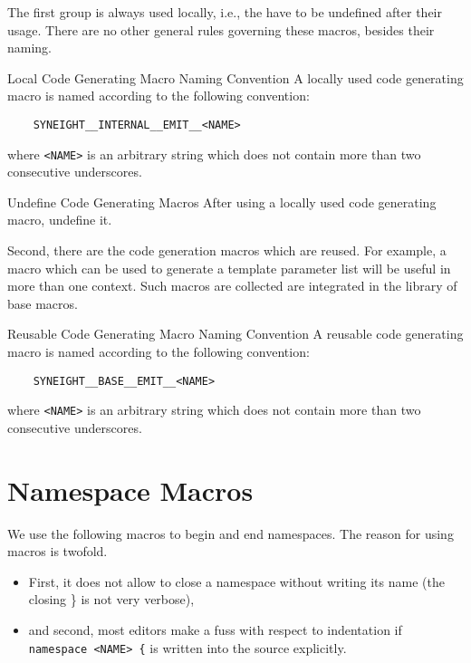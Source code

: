 The first group is always used locally, i.e., the have to be undefined
after their usage. There are no other general rules governing these
macros, besides their naming.

\begin{rule*}{Local Code Generating Macro Naming Convention}
  A locally used code generating macro is named according to the
  following convention:
  \begin{verbatim}
    SYNEIGHT__INTERNAL__EMIT__<NAME>
  \end{verbatim}
  where {\tt <NAME>} is an arbitrary string which does not contain
  more than two consecutive underscores.
\end{rule*}

\begin{rule*}{Undefine Code Generating Macros}
  After using a locally used code generating macro, undefine it.
\end{rule*}

Second, there are the code generation macros which are reused. For
example, a macro which can be used to generate a template parameter
list will be useful in more than one context. Such macros are
collected are integrated in the library of base macros. 
%
\begin{rule*}{Reusable Code Generating Macro Naming Convention}
  A reusable code generating macro is named according to the
  following convention:
  \begin{verbatim}
    SYNEIGHT__BASE__EMIT__<NAME>
  \end{verbatim}
  where {\tt <NAME>} is an arbitrary string which does not contain
  more than two consecutive underscores.
\end{rule*}



\section{Namespace Macros}
\label{sec:namespace-macros}

We use the following macros to begin and end namespaces. The reason
for using macros is twofold.

\begin{itemize}
\item First, it does not allow to close a namespace without writing its
  name (the closing \} is not very verbose),
\item and second, most editors make a fuss with respect to
  indentation if {\tt namespace <NAME> \{} is written into the source
  explicitly.
\end{itemize}

